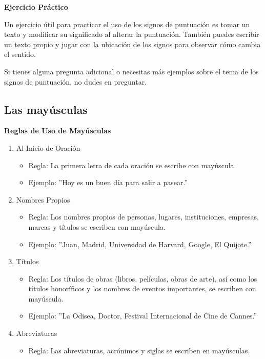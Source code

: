 \textbf{Ejercicio Práctico}

Un ejercicio útil para practicar el uso de los signos de puntuación es tomar un texto y modificar su significado al alterar la puntuación. También puedes escribir un texto propio y jugar con la ubicación de los signos para observar cómo cambia el sentido.

Si tienes alguna pregunta adicional o necesitas más ejemplos sobre el tema de los signos de puntuación, no dudes en preguntar.

\subsection{Las mayúsculas}

\textbf{Reglas de Uso de Mayúsculas}
\begin{enumerate}
      \item Al Inicio de Oración
            \begin{itemize}
                  \item Regla: La primera letra de cada oración se escribe con mayúscula.
                  \item Ejemplo: ''Hoy es un buen día para salir a pasear.''
            \end{itemize}
      \item Nombres Propios
            \begin{itemize}
                  \item Regla: Los nombres propios de personas, lugares, instituciones, empresas, marcas y títulos se escriben con mayúscula.
                  \item Ejemplo: ''Juan, Madrid, Universidad de Harvard, Google, El Quijote.''
            \end{itemize}
      \item Títulos
            \begin{itemize}
                  \item Regla: Los títulos de obras (libros, películas, obras de arte), así como los títulos honoríficos y los nombres de eventos importantes, se escriben con mayúscula.
                  \item Ejemplo: ''La Odisea, Doctor, Festival Internacional de Cine de Cannes.''
            \end{itemize}
      \item Abreviaturas
            \begin{itemize}
                  \item Regla: Las abreviaturas, acrónimos y siglas se escriben en mayúsculas.

\end{itemize}
\end{enumerate}
